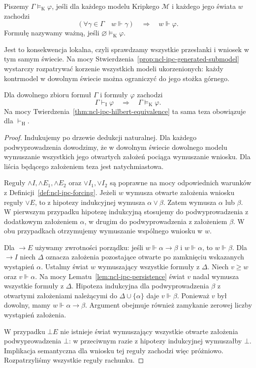 \begin{definicja}
\label{def:ncl-ipc-kripke-consequence}
Piszemy $\Gamma\models_{\mathrm K}\varphi$, jeśli
dla każdego modelu Kripkego $\mathcal M$
i każdego jego świata $w$ zachodzi
\[
 (\forall\gamma\in\Gamma\quad w\Vdash\gamma)
 \quad\Longrightarrow\quad w\Vdash\varphi.
\]
Formułę nazywamy ważną, jeśli
$\varnothing\models_{\mathrm K}\varphi$.
\end{definicja}
Jest to konsekwencja lokalna, czyli sprawdzamy
wszystkie przesłanki i wniosek w tym samym świecie.
Na mocy Stwierdzenia~\ref{prop:ncl-ipc-generated-submodel}
wystarczy rozpatrywać korzenie wszystkich modeli
ukorzenionych: każdy kontrmodel w dowolnym świecie
można ograniczyć do jego stożka górnego.

\begin{twierdzenie}
\label{thm:ncl-ipc-kripke-soundness}
Dla dowolnego zbioru formuł $\Gamma$ i formuły
$\varphi$ zachodzi
\[
 \Gamma\vdash_{\mathrm I}\varphi
 \quad\Longrightarrow\quad
 \Gamma\models_{\mathrm K}\varphi.
\]
Na mocy Twierdzenia~\ref{thm:ncl-ipc-hilbert-equivalence}
ta sama teza obowiązuje dla $\vdash_{\mathrm H}$.
\end{twierdzenie}
\begin{proof}
Indukujemy po drzewie dedukcji naturalnej.
Dla każdego podwyprowadzenia dowodzimy, że w
dowolnym świecie dowolnego modelu wymuszanie
wszystkich jego otwartych założeń pociąga wymuszanie
wniosku. Dla liścia będącego założeniem teza
jest natychmiastowa.

Reguły $\wedge I,\wedge E_1,\wedge E_2$ oraz
$\vee I_1,\vee I_2$ są poprawne na mocy
odpowiednich warunków z
Definicji~\ref{def:ncl-ipc-forcing}.
Jeżeli $w$ wymusza otwarte założenia wniosku
reguły $\vee E$, to z hipotezy indukcyjnej
wymusza $\alpha\vee\beta$. Zatem wymusza
$\alpha$ lub $\beta$. W pierwszym przypadku
hipotezę indukcyjną stosujemy do podwyprowadzenia
z dodatkowym założeniem $\alpha$, w drugim
do podwyprowadzenia z założeniem $\beta$.
W obu przypadkach otrzymujemy wymuszanie
wspólnego wniosku w $w$.

Dla $\to E$ używamy zwrotności porządku:
jeśli $w\Vdash\alpha\to\beta$ i $w\Vdash\alpha$,
to $w\Vdash\beta$.
Dla $\to I$ niech $\Delta$ oznacza założenia
pozostające otwarte po zamknięciu wskazanych
wystąpień $\alpha$. Ustalmy świat $w$
wymuszający wszystkie formuły z $\Delta$.
Niech $v\geq w$ oraz $v\Vdash\alpha$.
Na mocy Lematu~\ref{lem:ncl-ipc-persistence}
świat $v$ nadal wymusza wszystkie formuły z $\Delta$.
Hipoteza indukcyjna dla podwyprowadzenia
$\beta$ z otwartymi założeniami należącymi
do $\Delta\cup\{\alpha\}$ daje $v\Vdash\beta$.
Ponieważ $v$ był dowolny, mamy
$w\Vdash\alpha\to\beta$.
Argument obejmuje również zamykanie zerowej liczby
wystąpień założenia.

W przypadku $\bot E$ nie istnieje świat wymuszający
wszystkie otwarte założenia podwyprowadzenia $\bot$:
w przeciwnym razie z hipotezy indukcyjnej
wymuszałby $\bot$. Implikacja semantyczna
dla wniosku tej reguły zachodzi więc próżniowo.
Rozpatrzyliśmy wszystkie reguły rachunku.
\end{proof}

